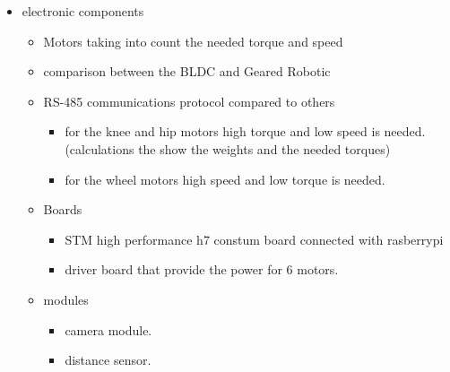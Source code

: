 \begin{itemize}
	\item electronic components 
	\begin{itemize}
		\item Motors taking into count the needed torque and speed
		\item comparison between the BLDC and Geared Robotic 
		\item RS-485 communications protocol compared to others 
		\begin{itemize}
			\item for the knee and hip motors high torque and low speed is needed.(calculations the show the weights and the needed torques)
			\item for the wheel motors high speed and low torque is needed. 
		\end{itemize}
		\item Boards 
		\begin{itemize}
			\item STM high performance h7 constum board connected with rasberrypi 
			\item driver board that provide the power for 6 motors. 
		\end{itemize}
		\item modules 
		\begin{itemize}
			\item camera module.
			\item distance sensor.
		\end{itemize}
	\end{itemize}
\end{itemize}



